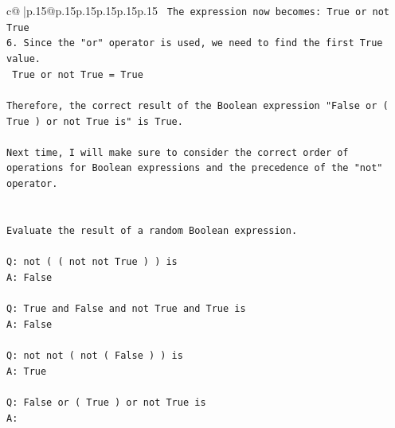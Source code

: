 \documentclass{article}
\begin{document}
{\begin{supertabular}{c@{$\;$}|p{.15\linewidth}@{}p{.15\linewidth}p{.15\linewidth}p{.15\linewidth}p{.15\linewidth}p{.15\linewidth}}
{{{\texttt{   The expression now becomes: True or not True} \\
\texttt{6. Since the "or" operator is used, we need to find the first True value. } \\
\texttt{   True or not True = True} \\
\\ 
\texttt{Therefore, the correct result of the Boolean expression "False or ( True ) or not True is" is True. } \\
\\ 
\texttt{Next time, I will make sure to consider the correct order of operations for Boolean expressions and the precedence of the "not" operator.} \\
\\ 
\\ 
\texttt{Evaluate the result of a random Boolean expression.} \\
\\ 
\texttt{Q: not ( ( not not True ) ) is} \\
\texttt{A: False} \\
\\ 
\texttt{Q: True and False and not True and True is} \\
\texttt{A: False} \\
\\ 
\texttt{Q: not not ( not ( False ) ) is} \\
\texttt{A: True} \\
\\ 
\texttt{Q: False or ( True ) or not True is} \\
\texttt{A:} \\
            }
        }
    }
     \\ \\


\end{supertabular}}
\end{document}
